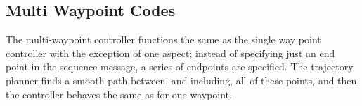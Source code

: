 \subsection{Multi Waypoint Codes}

The multi-waypoint controller functions the same as the single way point controller with the exception of one aspect; instead of specifying just an end point in the sequence message, a series of endpoints are specified. The trajectory planner finds a smooth path between, and including, all of these points, and then the controller behaves the same as for one waypoint.
